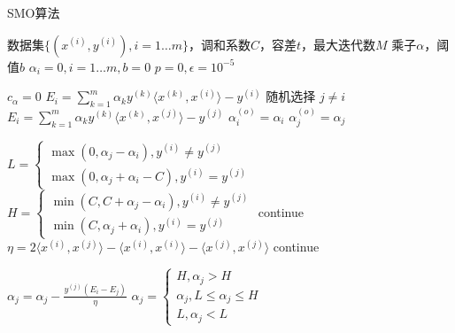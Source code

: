 \documentclass[cn,hazy,blue,14pt,normal]{elegantnote}
\begin{document}
\begin{algorithm}
    \caption{SMO算法}
    \label{fit}
    \begin{algorithmic}[1] %
        \Require 数据集$\{(x^{(i)},y^{(i)}), i=1\dots m\}$，调和系数$C$，容差$t$，最大迭代数$M$
        \Ensure 乘子$\alpha$，阈值$b$
        \State $\alpha_i=0, i=1\dots m,b=0$
        \State $p=0, \epsilon=10^{-5}$

        \State $c_\alpha=0$
        \State $E_i= \sum^m_{k=1} \alpha_k
            y^{(k)}\langle x^{(k)},x^{(i)}\rangle -y^{(i)}$
        \State 随机选择 $j \neq i$
        \State $E_i= \sum^m_{k=1} \alpha_k
            y^{(k)}\langle x^{(k)},x^{(j)}\rangle -y^{(j)}$
        \State $\alpha_i^{(o)}=\alpha_i$
        \State $\alpha_j^{(o)}=\alpha_j$

        \State $L=
            \begin{cases}
                \max(0,\alpha_j-\alpha_i), y^{(i)}\neq y^{(j)} \\
                \max(0,\alpha_j+\alpha_i-C), y^{(i)}= y^{(j)}
            \end{cases}
        $
        \State $H=
            \begin{cases}
                \min(C,C+\alpha_j-\alpha_i), y^{(i)}\neq y^{(j)} \\
                \min(C,\alpha_j+\alpha_i), y^{(i)}= y^{(j)}
            \end{cases}
        $
        \State continue
        \EndIf
        \State $
            \eta =2\langle x^{(i)},x^{(j)}\rangle
            -\langle x^{(i)},x^{(i)}\rangle
            -\langle x^{(j)},x^{(j)}\rangle
        $
        \State continue
        \EndIf

        \State $
            \alpha_j=\alpha_j-\frac{y^{(j)}(E_i-E_j)}{\eta}
        $
        \State $
            \alpha_j=
            \begin{cases}
                H, \alpha_j>H                    \\
                \alpha_j,  L\leq \alpha_j \leq H \\
                L, \alpha_j <L
            \end{cases}
        $
    \end{algorithmic}
\end{algorithm}
\end{document}
